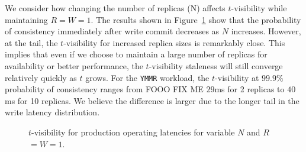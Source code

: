 \documentclass{vldb}
\begin{document}
We consider how changing the number of replicas (N) affects
$t$-visibility while maintaining $R$$=$$W$$=$$1$. The results shown in
Figure~\ref{fig:varyn} show that the probability of consistency
immediately after write commit decreases as $N$ increases.  However,
at the tail, the $t$-visibility for increased replica sizes is
remarkably close.  This implies that even if we choose to maintain a
large number of replicas for availability or better performance, the
$t$-visibility staleness will still converge relatively quickly as $t$
grows. For the \texttt{YMMR} workload, the $t$-visibility at $99.9\%$
probability of consistency ranges from FOOO FIX ME $29$ms for 2 replicas to $40$ms
for 10 replicas. We believe the difference is larger due to the longer
tail in the write latency distribution.

\begin{figure}
\centering
{}
\caption{$t$-visibility for production operating latencies for variable $N$ and $R$$=$$W$$=$$1$.}
\label{fig:varyn}
\end{figure}
\end{document}
